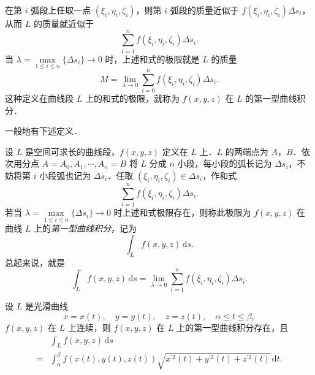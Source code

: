 在第 $i$ 弧段上任取一点 $(\xi_{i},\eta_{i},\zeta_{i})$，则第 $i$ 弧段的质量近似于 $f(\xi_{i},\eta_{i},\zeta_{i})\Delta s_{i}$，从而 $L$ 的质量就近似于
\[
\sum_{i=1}^{n}f(\xi_{i},\eta_{i},\zeta_{i})\Delta s_{i}.
\]
当 $\lambda=\max\limits_{1\leqslant i\leqslant n}\{\Delta s_{i}\}\to0$ 时，上述和式的极限就是 $L$ 的质量
\[
M=\lim_{\lambda\to0}\sum_{i=0}^{n}f(\xi_{i},\eta_{i},\zeta_{i})\Delta s_{i}.
\]
这种定义在曲线段 $L$ 上的和式的极限，就称为 $f(x,y,z)$ 在 $L$ 的第一型曲线积分．

一般地有下述定义．

\begin{definition}\label{def:21-1}
设 $L$ 是空间可求长的曲线段，$f(x,y,z)$ 定义在 $L$ 上．$L$ 的两端点为 $A$，$B$．依次用分点 $A=A_{0},A_{1},\cdots,A_{n}=B$ 将 $L$ 分成 $n$ 小段，每小段的弧长记为 $\Delta s_{i}$，不妨将第 $i$ 小段弧也记为 $\Delta s_{i}$．任取 $(\xi_{i},\eta_{i},\zeta_{i})\in\Delta s_{i}$，作和式
\[
\sum_{i=1}^{n}f(\xi_{i},\eta_{i},\zeta_{i})\Delta s_{i}.
\]
若当 $\lambda=\max\limits_{1\leqslant i\leqslant n}\{\Delta s_{i}\}\to0$ 时上述和式极限存在，则称此极限为 $f(x,y,z)$ 在曲线 $L$ 上的\emph{第一型曲线积分}，记为
\[
\int_{L}f(x,y,z)\,\mathrm{d}s.
\]
总起来说，就是
\[
\int_{L}f(x,y,z)\,\mathrm{d}s=\lim_{\lambda\to0}\sum_{i=1}^{n}f(\xi_{i},\eta_{i},\zeta_{i})\Delta s_{i}.
\]
\end{definition}

\begin{theorem}\label{thm:21-1}
设 $L$ 是光滑曲线
\[
x=x(t),\quad y=y(t),\quad z=z(t),\quad\alpha\leqslant t\leqslant\beta,
\]
$f(x,y,z)$ 在 $L$ 上连续，则 $f(x,y,z)$ 在 $L$ 上的第一型曲线积分存在，且
\[
\begin{aligned}
&\int_{L}f(x,y,z)\,\mathrm{d}s\\
={}&\int_{\alpha}^{\beta}f(x(t),y(t),z(t))\sqrt{x^{\prime2}(t)+y^{\prime2}(t)+z^{\prime2}(t)}\,\mathrm{d}t.
\end{aligned}
\]
\end{theorem}

